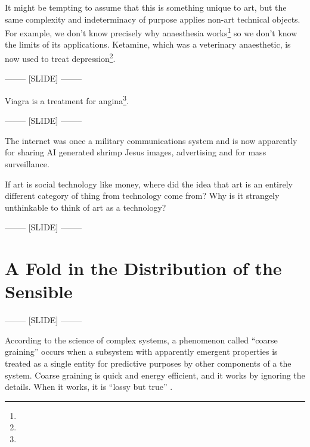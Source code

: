 \documentclass[letter:wpaper]{article}
\begin{document}
    It might be tempting to assume that this is something unique to art, but the same complexity and indeterminacy of purpose applies non-art technical objects. For example, we don't know precisely why anaesthesia works\footnote{

    } so we don't know the limits of its applications. Ketamine, which was a veterinary anaesthetic, is now used to treat depression\footnote{
    }. 

-------- [SLIDE] --------

    Viagra is a treatment for angina\footnote{
    }.

-------- [SLIDE] --------

    The internet was once a military communications system and is now apparently for sharing AI generated shrimp Jesus images, advertising and for mass surveillance. 

    If art is social technology like money, where did the idea that art is an entirely different category of thing from technology come from? Why is it strangely unthinkable to think of art as a technology?

-------- [SLIDE] --------

\section{A Fold in the Distribution of the Sensible}
    
-------- [SLIDE] --------

    According to the science of complex systems, a phenomenon called ``coarse graining'' occurs when a subsystem with apparently emergent properties is treated as a single entity for predictive purposes by other components of a the system. Coarse graining is quick and energy efficient, and it works by ignoring the details. When it works, it is ``lossy but true'' \citep[p.4]{FlackCrsGrnng2017}.
\end{document}
